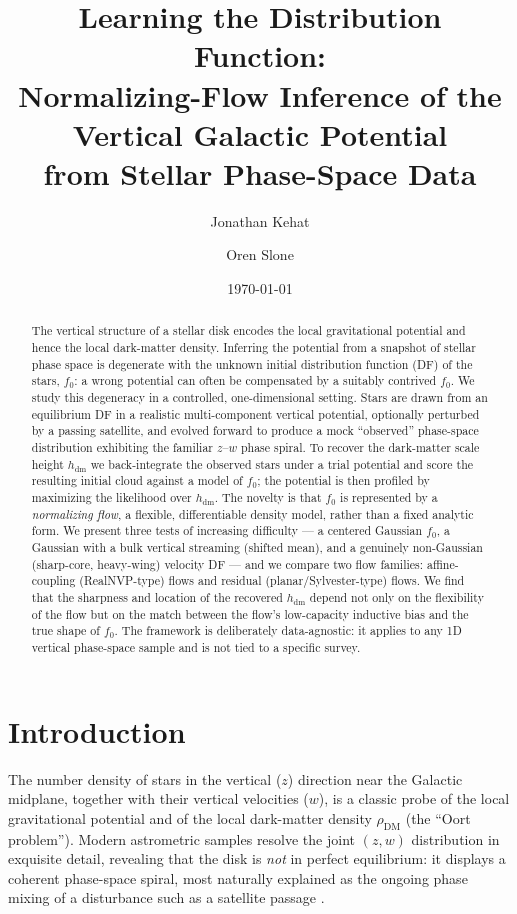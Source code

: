 \documentclass[11pt]{article}
\title{\bf Learning the Distribution Function:\\
Normalizing-Flow Inference of the Vertical Galactic Potential\\
from Stellar Phase-Space Data}
\author{Jonathan Kehat \and Oren Slone}
\date{\today}
\newcommand{\hdm}{h_{\mathrm{dm}}}
\newcommand{\ffo}{f_{0}}
\begin{document}
\maketitle

\begin{abstract}
The vertical structure of a stellar disk encodes the local gravitational
potential and hence the local dark-matter density. Inferring the potential
from a snapshot of stellar phase space is degenerate with the unknown
initial distribution function (DF) of the stars, $\ffo$: a wrong potential
can often be compensated by a suitably contrived $\ffo$. We study this
degeneracy in a controlled, one-dimensional setting. Stars are drawn from
an equilibrium DF in a realistic multi-component vertical potential,
optionally perturbed by a passing satellite, and evolved forward to produce
a mock ``observed'' phase-space distribution exhibiting the familiar
$z$--$w$ phase spiral. To recover the dark-matter scale height $\hdm$ we
back-integrate the observed stars under a trial potential and score the
resulting initial cloud against a model of $\ffo$; the potential is then
profiled by maximizing the likelihood over $\hdm$. The novelty is that
$\ffo$ is represented by a \emph{normalizing flow}, a flexible,
differentiable density model, rather than a fixed analytic form. We present
three tests of increasing difficulty --- a centered Gaussian $\ffo$, a
Gaussian with a bulk vertical streaming (shifted mean), and a genuinely
non-Gaussian (sharp-core, heavy-wing) velocity DF --- and we compare two
flow families: affine-coupling (RealNVP-type) flows and residual
(planar/Sylvester-type) flows. We find that the sharpness and location of
the recovered $\hdm$ depend not only on the flexibility of the flow but on
the match between the flow's low-capacity inductive bias and the true shape
of $\ffo$. The framework is deliberately data-agnostic: it applies to any
1D vertical phase-space sample and is not tied to a specific survey.
\end{abstract}

\section{Introduction}
\label{sec:intro}

The number density of stars in the vertical ($z$) direction near the
Galactic midplane, together with their vertical velocities ($w$), is a
classic probe of the local gravitational potential and of the local
dark-matter density $\rho_{\mathrm{DM}}$ (the ``Oort problem''). Modern
astrometric samples resolve the joint $(z,w)$ distribution in exquisite
detail, revealing that the disk is \emph{not} in perfect equilibrium: it
displays a coherent phase-space spiral, most naturally explained as the
ongoing phase mixing of a disturbance such as a satellite passage
\cite{widmark2021,antoja2018}.
\end{document}
